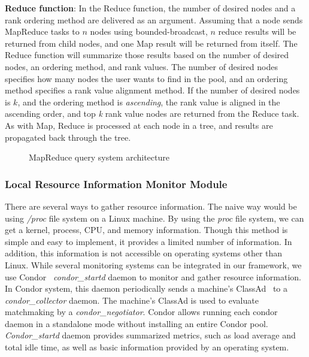 \documentclass{acm_proc_article-sp}
\begin{document}
\textbf{Reduce function}: In the Reduce function, the number of desired nodes and a rank ordering method are delivered as an argument.
Assuming that a node sends MapReduce tasks to $n$ nodes using bounded-broadcast, \begin{math}n\end{math} reduce results will be returned from child nodes, 
and one Map result will be returned from itself. The Reduce function will summarize those results based on the number of desired nodes, an ordering method, and rank values. 
The number of desired nodes specifies how many nodes the user wants to find in the pool, and an ordering method specifies a rank value alignment method. 
If the number of desired nodes is $k$, and the ordering method is \textit{ascending}, the rank value is aligned in the ascending order, and top \textit{k} rank value nodes are returned from the Reduce task.
As with Map, Reduce is processed at each node in a tree, and results are propagated back through the tree.
\begin{figure}
\centering
{}
\caption{\label{fig:mr_arch}MapReduce query system architecture}
\end{figure}
\subsubsection{Local Resource Information Monitor Module}
There are several ways to gather resource information. The naive way would be using \textit{/proc} file system on a Linux machine. 
By using the \textit{proc} file system, we can get a kernel, process, CPU, and memory information. 
Though this method is simple and easy to implement, it provides a limited number of information. In addition, this information is not accessible on operating systems other than Linux.
While several monitoring systems can be integrated in our framework, we use Condor~\cite{condor} \textit{condor\_startd} daemon to monitor and gather resource information. 
In Condor system, this daemon periodically sends a machine's ClassAd~\cite{classad} to a \textit{condor\_collector} daemon. 
The machine's ClassAd is used to evaluate matchmaking by a \textit{condor\_negotiator}. 
Condor allows running each condor daemon in a standalone mode without
installing an entire Condor pool. \textit{Condor\_startd} daemon provides summarized metrics, such as load average and total idle time, as well as basic information provided by an operating system.
\end{document}
